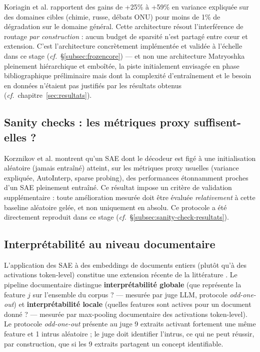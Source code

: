 \documentclass[11pt]{article}
\begin{document}
Koriagin et al. rapportent des gains de +25\% à +59\% en variance expliquée
sur des domaines cibles (chimie, russe, débats ONU) pour moins de 1\% de
dégradation sur le domaine général. Cette architecture résout l'interférence
de routage \emph{par construction} : aucun budget de sparsité n'est partagé
entre cœur et extension. C'est l'architecture concrètement implémentée et
validée à l'échelle dans ce stage (\emph{cf.}~\S\ref{subsec:frozencore}) ---
et non une architecture Matryoshka pleinement hiérarchique et emboîtée, la
piste initialement envisagée en phase bibliographique préliminaire mais dont
la complexité d'entraînement et le besoin en données n'étaient pas justifiés
par les résultats obtenus (\emph{cf.}~chapitre~\ref{sec:resultats}).

\subsection{Sanity checks : les métriques proxy suffisent-elles ?}

Korznikov et al. \cite{korznikov2025sanitychecks} montrent qu'un SAE dont le
décodeur est figé à une initialisation aléatoire (jamais entraîné) atteint,
sur les métriques proxy usuelles (variance expliquée, AutoInterp, sparse
probing), des performances étonnamment proches d'un SAE pleinement entraîné.
Ce résultat impose un critère de validation supplémentaire : toute
amélioration mesurée doit être évaluée \emph{relativement} à cette baseline
aléatoire gelée, et non uniquement en absolu. Ce protocole a été directement
reproduit dans ce stage (\emph{cf.}~\S\ref{subsec:sanity-check-resultats}).

\subsection{Interprétabilité au niveau documentaire}

L'application des SAE à des embeddings de documents entiers (plutôt qu'à des
activations token-level) constitue une extension récente de la littérature
\cite{jiang2024sae_embeddings, decodedense2025}. Le pipeline documentaire
distingue \textbf{interprétabilité globale} (que représente la feature $j$ sur
l'ensemble du corpus ? --- mesurée par juge LLM, protocole \emph{odd-one-out})
et \textbf{interprétabilité locale} (quelles features sont actives pour un
document donné ? --- mesurée par max-pooling documentaire des activations
token-level). Le protocole \emph{odd-one-out}
\cite{templeton2024scaling} présente au juge 9 extraits activant fortement une
même feature et 1 intrus aléatoire ; le juge doit identifier l'intrus, ce qui
ne peut réussir, par construction, que si les 9 extraits partagent un concept
identifiable.
\end{document}

